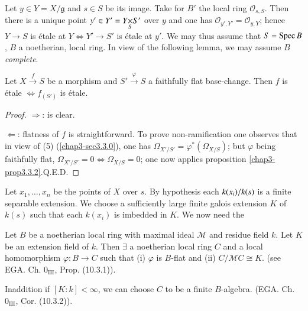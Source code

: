 Let $y\in Y=X/\mathfrak{g}$ and $s\in S$ be its image. Take for $B'$
the local ring $\mathscr{O}_{s,S}$. Then there is a unique point
$y'\in Y'=\fprod{Y}{S'}{S}$ over $y$ and one has
$\mathscr{O}_{y',Y'}=\mathscr{O}_{y,Y}$; hence\pageoriginale $Y\to S$
is \'etale at $Y\Leftrightarrow Y'\to S'$ is \'etale at $y'$. We may
thus assume that $S=\operatorname{Spec} B$, $B$ a noetherian, local ring. In view of
the following lemma, we may assume $B$ {\em complete}.

\begin{lemma}\label{chap4-lem4.1.1}
Let $X\xrightarrow{f}S$ be a morphism and $S'\xrightarrow{\varphi}S$ a
faithfully flat base-change. Then $f$ is \'etale $\Leftrightarrow
f_{(S')}$ is \'etale.
\end{lemma}


\begin{proof}
$\Rightarrow$: is clear.

$\Leftarrow$: flatness of $f$ is straightforward. To prove
  non-ramification one observes that in view of (5)
  (\ref{chap3-sec3.3.0}), one has 
  $\Omega_{X'/S'}=\varphi^{\ast}(\Omega_{X/S})$; but $\varphi$ being
  faithfully flat, $\Omega_{X'/S'}=0\Leftrightarrow \Omega_{X/S}=0$;
  one now applies proposition \ref{chap3-prop3.3.2}.\hfill Q.E.D.
\end{proof}

Let $x_{1},\ldots,x_{n}$ be the points of $X$ over $s$. By hypothesis
each $k(x_{i})/\break k(s)$ is a finite separable extension. We choose a
sufficiently large finite galois extension $K$ of $k(s)$ such that
each $k(x_{i})$ is imbedded in $K$. We now need the 

\begin{lemma}\label{chap4-lem4.1.2}
Let $B$ be a noetherian local ring with maximal ideal $\mathscr{M}$
and residue field $k$. Let $K$ be an extension field of $k$. Then
$\exists$ a noetherian local ring $C$ and a local homomorphism
$\varphi:B\to C$ such that (i) $\varphi$ is $B$-flat and (ii)
$C/\mathscr{M}C\cong K$. (see EGA. Ch. $\text{0}_{\text{III}}$,
Prop. (10.3.1)).
\end{lemma}

In\pageoriginale addition if $[K:k]<\infty$, we can choose $C$ to be a
finite $B$-algebra. (EGA. Ch. $0_{\text{III}}$, Cor. (10.3.2)).


